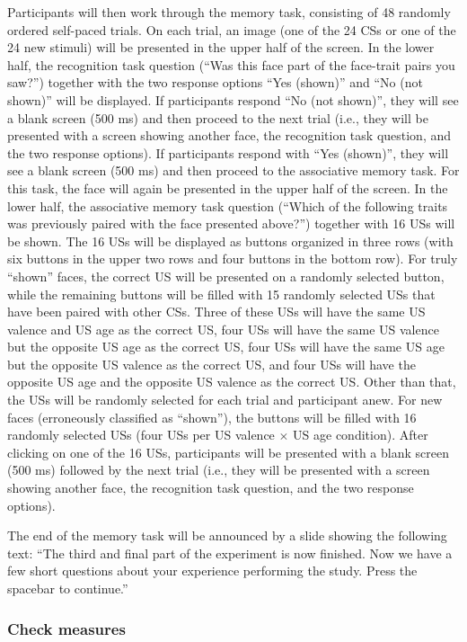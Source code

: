 \documentclass[
  doc,floatsintext]{apa6}
\begin{document}
Participants will then work through the memory task, consisting of 48 randomly ordered self-paced trials.
On each trial, an image (one of the 24 CSs or one of the 24 new stimuli) will be presented in the upper half of the screen.
In the lower half, the recognition task question (``Was this face part of the face-trait pairs you saw?'') together with the two response options ``Yes (shown)'' and ``No (not shown)'' will be displayed.
If participants respond ``No (not shown)'', they will see a blank screen (500 ms) and then proceed to the next trial (i.e., they will be presented with a screen showing another face, the recognition task question, and the two response options).
If participants respond with ``Yes (shown)'', they will see a blank screen (500 ms) and then proceed to the associative memory task.
For this task, the face will again be presented in the upper half of the screen.
In the lower half, the associative memory task question (``Which of the following traits was previously paired with the face presented above?'') together with 16 USs will be shown.
The 16 USs will be displayed as buttons organized in three rows (with six buttons in the upper two rows and four buttons in the bottom row).
For truly ``shown'' faces, the correct US will be presented on a randomly selected button, while the remaining buttons will be filled with 15 randomly selected USs that have been paired with other CSs.
Three of these USs will have the same US valence and US age as the correct US, four USs will have the same US valence but the opposite US age as the correct US, four USs will have the same US age but the opposite US valence as the correct US, and four USs will have the opposite US age and the opposite US valence as the correct US.
Other than that, the USs will be randomly selected for each trial and participant anew.
For new faces (erroneously classified as ``shown''), the buttons will be filled with 16 randomly selected USs (four USs per US valence \(\times\) US age condition). After clicking on one of the 16 USs, participants will be presented with a blank screen (500 ms) followed by the next trial (i.e., they will be presented with a screen showing another face, the recognition task question, and the two response options).

The end of the memory task will be announced by a slide showing the following text:
``The third and final part of the experiment is now finished.
Now we have a few short questions about your experience performing the study.
Press the spacebar to continue.''

\hypertarget{check-measures}{%
\subsubsection{Check measures}\label{check-measures}}
\end{document}

